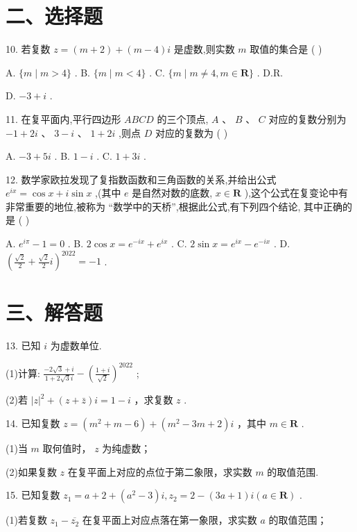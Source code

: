 \section*{二、选择题}

10. 若复数 $z = \left( {m + 2}\right)  + \left( {m - 4}\right) {i}$ 是虚数,则实数 $m$ 取值的集合是 ( )

A. $\{ m \mid  m > 4\}$ . B. $\{ m \mid  m < 4\}$ . C. $\{ m \mid  m \neq  4,m \in  \mathbf{R}\}$ . D.R.

D. $- 3 + {i}$ .

11. 在复平面内,平行四边形 ${ABCD}$ 的三个顶点, $A\text{ 、 }B\text{ 、 }C$ 对应的复数分别为 $- 1 + 2{i}\text{ 、 }3 - {i}\text{ 、 }1 + 2{i}$ ,则点 $D$ 对应的复数为 ( )

A. $- 3 + 5{i}$ . B. $1 - {i}$ . C. $1 + 3{i}$ .


12. 数学家欧拉发现了复指数函数和三角函数的关系,并给出公式 ${{e}}^{{i}x} = \cos x + {i}\sin x$ ,(其中 ${e}$ 是自然对数的底数, $x \in  \mathbf{R}$ ),这个公式在复变论中有非常重要的地位,被称为 “数学中的天桥”,根据此公式,有下列四个结论, 其中正确的是 ( )

A. ${{e}}^{{i}\pi } - 1 = 0$ . B. $2\cos x = {{e}}^{-{i}x} + {{e}}^{{i}x}$ . C. $2\sin x = {{e}}^{{i}x} - {{e}}^{-{i}x}$ . D. ${\left( \frac{\sqrt{2}}{2} + \frac{\sqrt{2}}{2}{i}\right) }^{2022} =  - 1$ .

\section*{三、解答题}

13. 已知 ${i}$ 为虚数单位.

(1)计算: $\frac{-2\sqrt{3} + {i}}{1 + 2\sqrt{3}{i}} - {\left( \frac{1 + {i}}{\sqrt{2}}\right) }^{2022}$ ;

(2)若 ${\left| z\right| }^{2} + \left( {z + \bar{z}}\right) {i} = 1 - {i}$ ，求复数 $z$ .

14. 已知复数 $z = \left( {{m}^{2} + m - 6}\right)  + \left( {{m}^{2} - {3m} + 2}\right) {i}$ ，其中 $m \in  \mathbf{R}$ .

(1)当 $m$ 取何值时， $z$ 为纯虚数；

(2)如果复数 $z$ 在复平面上对应的点位于第二象限，求实数 $m$ 的取值范围.

15. 已知复数 ${z}_{1} = a + 2 + \left( {{a}^{2} - 3}\right) {i},{z}_{2} = 2 - \left( {{3a} + 1}\right) {i}\left( {a \in  \mathbf{R}}\right)$ .

(1)若复数 ${z}_{1} - \overline{{z}_{2}}$ 在复平面上对应点落在第一象限，求实数 $a$ 的取值范围；

